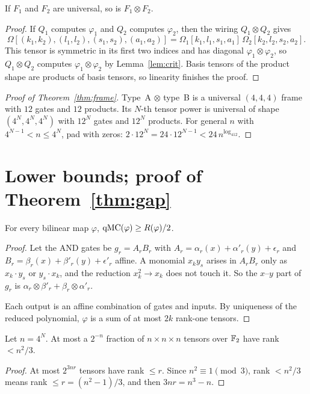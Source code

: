 \begin{lemma}\label{lem:tensor}
If $F_1$ and $F_2$ are universal, so is $F_1\otimes F_2$.
\end{lemma}
\begin{proof}
If $Q_1$ computes $\varphi_1$ and $Q_2$ computes $\varphi_2$, then the wiring $Q_1\otimes Q_2$ gives
\[
\Omega[(k_1,k_2),(l_1,l_2),(s_1,s_2),(a_1,a_2)]=\Omega_1[k_1,l_1,s_1,a_1]\,\Omega_2[k_2,l_2,s_2,a_2].
\]
This tensor is symmetric in its first two indices and has diagonal $\varphi_1\otimes\varphi_2$, so $Q_1\otimes Q_2$ computes $\varphi_1\otimes\varphi_2$ by Lemma~\ref{lem:crit}. Basis tensors of the product shape are products of basis tensors, so linearity finishes the proof.
\end{proof}

\begin{proof}[Proof of Theorem~\ref{thm:frame}]
Type~A $\otimes$ type~B is a universal $(4,4,4)$ frame with $12$ gates and $12$ products. Its $N$-th tensor power is universal of shape $(4^N,4^N,4^N)$ with $12^N$ gates and $12^N$ products. For general $n$ with $4^{N-1}<n\le4^N$, pad with zeros: $2\cdot12^N=24\cdot12^{N-1}<24\,n^{\log_412}$.
\end{proof}

\section{Lower bounds; proof of Theorem~\ref{thm:gap}}

\begin{lemma}\label{lem:q}
For every bilinear map $\varphi$, $\operatorname{qMC}(\varphi)\ge R(\varphi)/2$.
\end{lemma}
\begin{proof}
Let the AND gates be $g_r=A_rB_r$ with $A_r=\alpha_r(x)+\alpha'_r(y)+\epsilon_r$ and $B_r=\beta_r(x)+\beta'_r(y)+\epsilon'_r$ affine. A monomial $x_ky_s$ arises in $A_rB_r$ only as $x_k\cdot y_s$ or $y_s\cdot x_k$, and the reduction $x_k^2\to x_k$ does not touch it. So the $x$--$y$ part of $g_r$ is $\alpha_r\otimes\beta'_r+\beta_r\otimes\alpha'_r$.

Each output is an affine combination of gates and inputs. By uniqueness of the reduced polynomial, $\varphi$ is a sum of at most $2k$ rank-one tensors.
\end{proof}

\begin{lemma}\label{lem:count}
Let $n=4^N$. At most a $2^{-n}$ fraction of $n\times n\times n$ tensors over $\mathbb F_2$ have rank $<n^2/3$.
\end{lemma}
\begin{proof}
At most $2^{3nr}$ tensors have rank $\le r$. Since $n^2\equiv1\pmod3$, rank $<n^2/3$ means rank $\le r=(n^2-1)/3$, and then $3nr=n^3-n$.
\end{proof}


